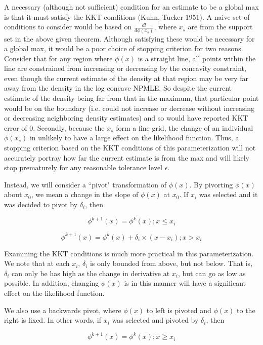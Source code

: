 \documentclass[10pt]{article}
\begin{document}
	A necessary (although not sufficient) condition for an estimate to be a global max is that it must satisfy the KKT conditions (Kuhn, Tucker 1951). A naive set of conditions to consider would be based on $\frac {dl}{d\phi(x_s)}$, where $x_s$ are from the support set in the above given theorem. Although satisfying these would be necessary for a global max, it would be a poor choice of stopping criterion for two reasons. Consider that for any region where $\phi(x)$ is a straight line, all points within the line are constrained from increasing or decreasing by the concavity constraint, even though the current estimate of the density at that region may be very far away from the density in the log concave NPMLE. So despite the current estimate of the density being far from that in the maximum, that particular point would be on the boundary (i.e. could not increase or decrease without increasing or decreasing neighboring density estimates) and so would have reported KKT error of 0. Secondly, because the $x_s$ form a fine grid, the change of an individual $\phi(x_s)$ in unlikely to have a large effect on the likelihood function. Thus, a stopping criterion based on the KKT conditions of this parameterization will not accurately portray how far the current estimate is from the max and will likely stop prematurely for any reasonable tolerance level $\epsilon$. 
	
	Instead, we will consider a ``pivot" transformation of $\phi(x)$. By pivorting $\phi(x)$ about $x_0$, we mean a change in the slope of $\phi(x)$ at $x_0$. If $x_i$ was selected and it was decided to pivot by $\delta_i$, then
	
	\[ \phi^{k+1}(x) = \phi^{k}(x); x \leq x_i
	\]
	
	\[ \phi^{k+1}(x) = \phi^{k}(x) + \delta_i \times (x - x_i) ; x > x_i
	\]

	Examining the KKT conditions is much more practical in this parameterization. We note that at each $x_i$, $\delta_i$ is only bounded from above, but not below. That is, $\delta_i$ can only be has high as the change in derivative at $x_i$, but can go as low as possible. In addition, changing $\phi(x)$ is in this manner will have a significant effect on the likelihood function. 
	
	We also use a backwards pivot, where $\phi(x)$ to left is pivoted and $\phi(x)$ to the right is fixed. In other words, if $x_i$ was selected and pivoted by $\delta_i$, then 

	\[ \phi^{k+1}(x) = \phi^{k}(x); x \geq x_i
	\]
	
\end{document}
